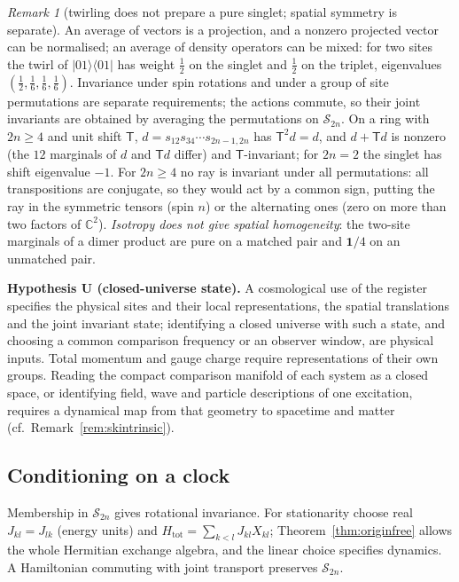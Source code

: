 \documentclass[aps,pra,onecolumn,superscriptaddress,nofootinbib,10pt]{revtex4-2}
\theoremstyle{definition}
\theoremstyle{remark}
\newtheorem{remark}[theorem]{Remark}
\newcommand{\C}{\mathbb{C}}
\begin{document}
\begin{remark}[twirling does not prepare a pure singlet; spatial symmetry is separate]\label{rem:cutransl}
An average of vectors is a projection, and a nonzero projected vector can be normalised; an average of
density operators can be mixed: for two sites the twirl of $\lvert01\rangle\langle01\rvert$ has weight $\tfrac12$ on the singlet and $\tfrac12$
on the triplet, eigenvalues $(\tfrac12,\tfrac16,\tfrac16,\tfrac16)$.  Invariance under spin rotations and under a group of site
permutations are separate requirements; the actions commute, so their joint invariants are obtained by
averaging the permutations on $\mathcal S_{2n}$.  On a ring with $2n\ge4$ and unit shift $\mathsf T$, $d=s_{12}s_{34}\cdots s_{2n-1,2n}$ has
$\mathsf T^2d=d$, and $d+\mathsf Td$ is nonzero (the $12$ marginals of $d$ and $\mathsf Td$ differ) and $\mathsf T$-invariant; for $2n=2$ the singlet
has shift eigenvalue $-1$.  For $2n\ge4$ no ray is invariant under all permutations: all transpositions are
conjugate, so they would act by a common sign, putting the ray in the symmetric tensors (spin $n$) or the
alternating ones (zero on more than two factors of $\C^2$).  \emph{Isotropy does not give spatial homogeneity}:
the two-site marginals of a dimer product are pure on a matched pair and $\mathbf1/4$ on an unmatched pair.
\end{remark}

\smallskip\noindent\textbf{Hypothesis U (closed-universe state).}\label{hyp:U}  A cosmological use of the register specifies
the physical sites and their local representations, the spatial translations and the joint invariant
state; identifying a closed universe with such a state, and choosing a common comparison frequency or an
observer window, are physical inputs.  Total momentum and gauge charge require representations of their
own groups.  Reading the compact comparison manifold of each system as a closed space, or identifying
field, wave and particle descriptions of one excitation, requires a dynamical map from that geometry to
spacetime and matter (cf.\ Remark~\ref{rem:skintrinsic}).

\subsection{Conditioning on a clock}\label{sec:cuclock}
Membership in $\mathcal S_{2n}$ gives rotational invariance.  For stationarity choose real $J_{kl}=J_{lk}$ (energy units) and
$H_{\mathrm{tot}}=\sum_{k<l}J_{kl}X_{kl}$; Theorem~\ref{thm:originfree} allows the whole Hermitian exchange algebra, and the linear choice
specifies dynamics.  A Hamiltonian commuting with joint transport preserves $\mathcal S_{2n}$.
\end{document}
